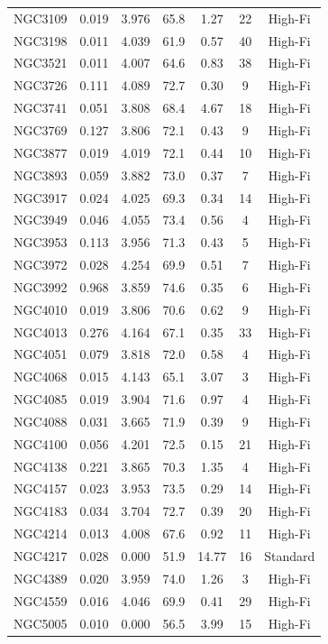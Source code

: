 \begin{longtable}{lcccccc}
NGC3109 & 0.019 & 3.976 & 65.8 & 1.27 & 22 & High-Fi \\
NGC3198 & 0.011 & 4.039 & 61.9 & 0.57 & 40 & High-Fi \\
NGC3521 & 0.011 & 4.007 & 64.6 & 0.83 & 38 & High-Fi \\
NGC3726 & 0.111 & 4.089 & 72.7 & 0.30 & 9 & High-Fi \\
NGC3741 & 0.051 & 3.808 & 68.4 & 4.67 & 18 & High-Fi \\
NGC3769 & 0.127 & 3.806 & 72.1 & 0.43 & 9 & High-Fi \\
NGC3877 & 0.019 & 4.019 & 72.1 & 0.44 & 10 & High-Fi \\
NGC3893 & 0.059 & 3.882 & 73.0 & 0.37 & 7 & High-Fi \\
NGC3917 & 0.024 & 4.025 & 69.3 & 0.34 & 14 & High-Fi \\
NGC3949 & 0.046 & 4.055 & 73.4 & 0.56 & 4 & High-Fi \\
NGC3953 & 0.113 & 3.956 & 71.3 & 0.43 & 5 & High-Fi \\
NGC3972 & 0.028 & 4.254 & 69.9 & 0.51 & 7 & High-Fi \\
NGC3992 & 0.968 & 3.859 & 74.6 & 0.35 & 6 & High-Fi \\
NGC4010 & 0.019 & 3.806 & 70.6 & 0.62 & 9 & High-Fi \\
NGC4013 & 0.276 & 4.164 & 67.1 & 0.35 & 33 & High-Fi \\
NGC4051 & 0.079 & 3.818 & 72.0 & 0.58 & 4 & High-Fi \\
NGC4068 & 0.015 & 4.143 & 65.1 & 3.07 & 3 & High-Fi \\
NGC4085 & 0.019 & 3.904 & 71.6 & 0.97 & 4 & High-Fi \\
NGC4088 & 0.031 & 3.665 & 71.9 & 0.39 & 9 & High-Fi \\
NGC4100 & 0.056 & 4.201 & 72.5 & 0.15 & 21 & High-Fi \\
NGC4138 & 0.221 & 3.865 & 70.3 & 1.35 & 4 & High-Fi \\
NGC4157 & 0.023 & 3.953 & 73.5 & 0.29 & 14 & High-Fi \\
NGC4183 & 0.034 & 3.704 & 72.7 & 0.39 & 20 & High-Fi \\
NGC4214 & 0.013 & 4.008 & 67.6 & 0.92 & 11 & High-Fi \\
NGC4217 & 0.028 & 0.000 & 51.9 & 14.77 & 16 & Standard \\
NGC4389 & 0.020 & 3.959 & 74.0 & 1.26 & 3 & High-Fi \\
NGC4559 & 0.016 & 4.046 & 69.9 & 0.41 & 29 & High-Fi \\
NGC5005 & 0.010 & 0.000 & 56.5 & 3.99 & 15 & High-Fi \\

\end{longtable}
